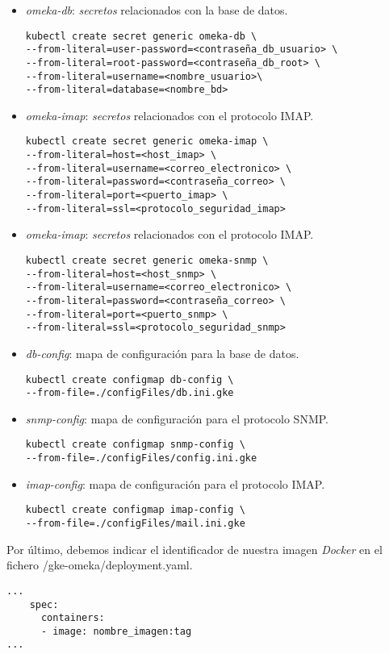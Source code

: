 \begin{itemize}
\tightlist
\item
  \emph{omeka-db}: \emph{secretos} relacionados con la base de datos.
  \begin{verbatim}
kubectl create secret generic omeka-db \
--from-literal=user-password=<contraseña_db_usuario> \
--from-literal=root-password=<contraseña_db_root> \
--from-literal=username=<nombre_usuario>\
--from-literal=database=<nombre_bd>
  \end{verbatim}
\item
  \emph{omeka-imap}: \emph{secretos} relacionados con el protocolo IMAP.
    \begin{verbatim}
kubectl create secret generic omeka-imap \
--from-literal=host=<host_imap> \
--from-literal=username=<correo_electronico> \
--from-literal=password=<contraseña_correo> \
--from-literal=port=<puerto_imap> \
--from-literal=ssl=<protocolo_seguridad_imap>
  \end{verbatim}
\item
  \emph{omeka-imap}: \emph{secretos} relacionados con el protocolo IMAP.
    \begin{verbatim}
kubectl create secret generic omeka-snmp \
--from-literal=host=<host_snmp> \
--from-literal=username=<correo_electronico> \
--from-literal=password=<contraseña_correo> \
--from-literal=port=<puerto_snmp> \
--from-literal=ssl=<protocolo_seguridad_snmp>
  \end{verbatim}
  \item
  \emph{db-config}: mapa de configuración para la base de datos.
    \begin{verbatim}
kubectl create configmap db-config \
--from-file=./configFiles/db.ini.gke
  \end{verbatim}
    \item
  \emph{snmp-config}: mapa de configuración para el protocolo SNMP.
    \begin{verbatim}
kubectl create configmap snmp-config \
--from-file=./configFiles/config.ini.gke
  \end{verbatim}
      \item
  \emph{imap-config}: mapa de configuración para el protocolo IMAP.
    \begin{verbatim}
kubectl create configmap imap-config \
--from-file=./configFiles/mail.ini.gke
  \end{verbatim}
\end{itemize}

Por último, debemos indicar el identificador de nuestra imagen
\emph{Docker} en el fichero {/gke-omeka/deployment.yaml}.
\begin{verbatim}
...
    spec:
      containers:
      - image: nombre_imagen:tag
...
\end{verbatim}

